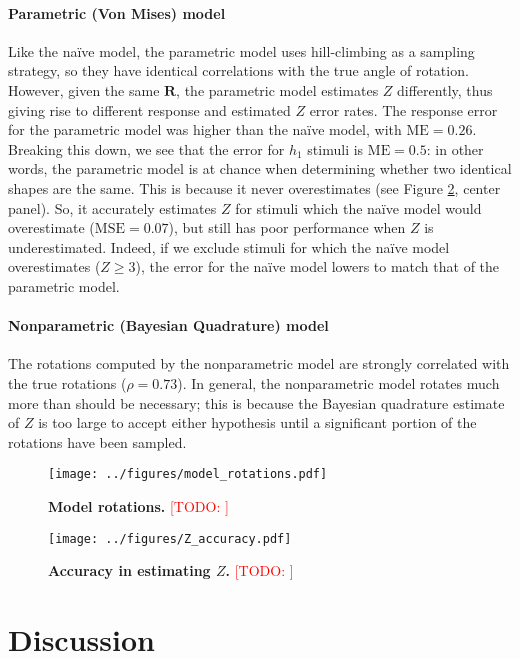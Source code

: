 \documentclass{article} %
\newcommand{\TODO}[1]{\textcolor{red}{[TODO: #1]}}
\newcommand{\MSE}[0]{\mathrm{MSE}}
\newcommand{\ME}[0]{\mathrm{ME}}
\newcommand{\naive}[0]{na\"ive}
\begin{document}
\paragraph{Parametric (Von Mises) model}

Like the \naive{} model, the parametric model uses hill-climbing as a
sampling strategy, so they have identical correlations with the true
angle of rotation. However, given the same $\mathbf{R}$, the
parametric model estimates $Z$ differently, thus giving rise to
different response and estimated $Z$ error rates. The response error
for the parametric model was higher than the \naive{} model, with
$\ME{}=0.26$. Breaking this down, we see that the error for $h_1$
stimuli is $\ME{}=0.5$: in other words, the parametric model is at
chance when determining whether two identical shapes are the
same. This is because it never overestimates (see Figure
\ref{fig:accuracy}, center panel). So, it accurately estimates $Z$ for
stimuli which the \naive{} model would overestimate ($\MSE{}=0.07$),
but still has poor performance when $Z$ is underestimated. Indeed, if
we exclude stimuli for which the \naive{} model overestimates ($Z\geq
3$), the error for the \naive{} model lowers to match that of the
parametric model.

\paragraph{Nonparametric (Bayesian Quadrature) model}

The rotations computed by the nonparametric model are strongly
correlated with the true rotations ($\rho=0.73$). In general, the
nonparametric model rotates much more than should be necessary; this
is because the Bayesian quadrature estimate of $Z$ is too large to
accept either hypothesis until a significant portion of the rotations
have been sampled.

\begin{figure}[t]
  \centering
  \texttt{[image: ../figures/model\_rotations.pdf]}
  \caption{\textbf{Model rotations.} \TODO{}}
  \label{fig:rotations}
\end{figure}

\begin{figure}[t]
  \centering
  \texttt{[image: ../figures/Z\_accuracy.pdf]}
  \caption{\textbf{Accuracy in estimating $Z$.} \TODO{}}
  \label{fig:accuracy}
\end{figure}

\section{Discussion}
\end{document}
